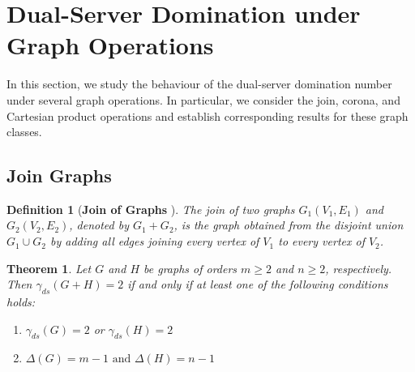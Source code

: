 \documentclass{article}
\newtheorem{theorem}{Theorem}[section]
\newtheorem{definition}{Definition}[section]
\begin{document}
\section{Dual-Server Domination under Graph Operations}

In this section, we study the behaviour of the dual-server domination number under several graph operations. In particular, we consider the join, corona, and Cartesian product operations and establish corresponding results for these 
graph classes.
\subsection{Join Graphs}
\begin{definition}
[\textbf{Join of Graphs }\cite{West}]
The join of two graphs $G_1(V_1,E_1)$ and $G_2(V_2,E_2)$, denoted by $G_1+G_2$, is the graph obtained from the disjoint union $G_1\cup G_2$ by adding all edges joining every vertex of $V_1$ to every vertex of $V_2$.
\end{definition}
\begin{theorem}\label{DJP2}
Let $G$ and $H$ be graphs of orders $m \geq 2$ and $n \geq 2$, respectively. Then $\gamma_{ds}(G+H)= 2$ if and only if at least one of the following conditions holds:
\begin{enumerate}
\item {$\gamma_{ds}(G)= 2$} or {$\gamma_{ds}(H)= 2$} 
\item{$\Delta(G)= m-1 \text{ and } \Delta(H)= n-1$}
\end{enumerate}
\end{theorem}
\end{document}
